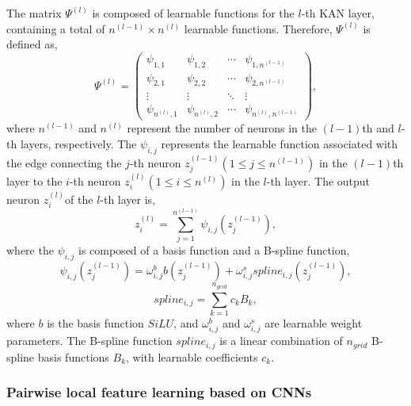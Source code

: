 \documentclass[journal,twoside,web]{ieeecolor}
\begin{document}
The matrix $\varPsi^{(l)}$ is composed of learnable functions for the $l$-th KAN layer, containing a total of $n^{(l - 1)} \times n^{(l)}$ learnable functions. Therefore, $\varPsi^{(l)}$ is defined as,
\begin{equation}
    \varPsi^{(l)} = \left(
    \begin{array}{cccc}
        \psi_{1,1} & \psi_{1,2} & \cdots & \psi_{1,n^{(l-1)}} \\
        \psi_{2,1} & \psi_{2,2} & \cdots & \psi_{2,n^{(l-1)}} \\
        \vdots & \vdots & \ddots & \vdots \\
        \psi_{n^{(l)},1} & \psi_{n^{(l)},2} & \cdots & \psi_{n^{(l)},n^{(l-1)}}
    \end{array}
    \right),
\end{equation}
where $n^{(l - 1)}$ and $n^{(l)}$ represent the number of neurons in the $(l - 1)$th and $l$-th layers, respectively. The $\psi_{i,j}$ represents the learnable function associated with the edge connecting the $j$-th neuron $z^{(l-1)}_j (1\leqslant j\leqslant n^{(l-1)})$ in the $(l-1)$th layer to the $i$-th neuron $z^{(l)}_i (1\leqslant i\leqslant n^{(l)})$ in the $l$-th layer. The output neuron $z^{(l)}_i$of the $l$-th layer is,
\begin{equation}
    z^{(l)}_i = \sum_{j = 1}^{n^{(l-1)}}  \psi_{i,j}(z^{(l-1)}_j),
\end{equation}
where the $\psi_{i,j}$ is composed of a basis function and a B-spline function,
\begin{equation}
    \psi_{i,j}(z^{(l-1)}_j) = \omega^{b}_{i,j}b(z^{(l-1)}_j) + \omega^{s}_{i,j}spline_{i,j}(z^{(l-1)}_j),
\end{equation}
\begin{equation}
    spline_{i,j} = \sum_{k = 1}^{n_{grid}}c_{k} B_{k},
\end{equation}
where $b$ is the basis function ${SiLU}$, and $\omega^{b}_{i,j}$ and $\omega^{s}_{i,j}$ are learnable weight parameters. The B-spline function $spline_{i,j}$ is a linear combination of $n_{grid}$ B-spline basis functions $B_{k}$, with learnable coefficients $c_{k}$.

\subsubsection{Pairwise local feature learning based on CNNs}
\end{document}
